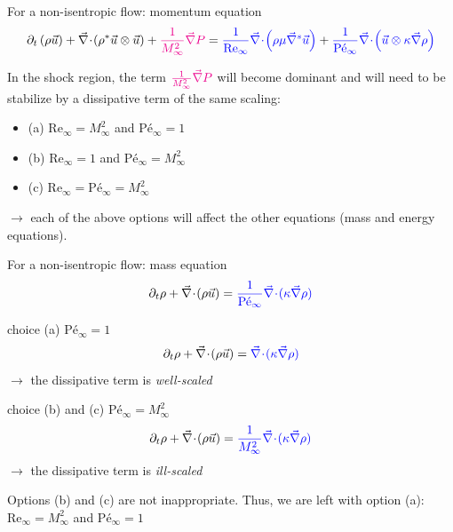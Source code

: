 \documentclass[xcolor=dvipsnames,10pt]{beamer}
\renewcommand{\Re}{\textrm{Re}}
\newcommand{\Pe}{\textrm{P\'e}}
\renewcommand{\div}{\vec{\nabla}\! \cdot \!}
\newcommand{\grad}{\vec{\nabla}}
\newcommand{\gradd}[1]{\vec{\nabla}^{#1}}
\begin{document}
\begin{frame}{For a non-isentropic flow: momentum equation}
\begin{align}
\partial_{t} \left( \rho \vec{u} \right) 
+ \div \left( \rho^* \vec{u}\otimes \vec{u} \right) 
+ \textcolor{magenta}{\frac{1}{M_\infty^2}\grad  P}  
= 
\textcolor{blue}{\frac{1}{\Re_\infty} \div \left( \rho \mu \gradd{s} \vec{u} \right)} +
\textcolor{blue}{\frac{1}{\Pe_\infty} \div \left(\vec{u}\otimes \kappa \grad  \rho \right)} \nonumber
\end{align}
\begin{block}{}
In the shock region, the term $\textcolor{magenta}{\frac{1}{M_\infty^2}\grad  P}  $ will become dominant and will need to be stabilize by a dissipative term of the same scaling:
\begin{itemize}
\setlength{\itemsep}{10pt}
\item (a) $\Re_\infty = M_\infty^2$ and $\Pe_\infty = 1$
\item (b) $\Re_\infty = 1$ and $\Pe_\infty = M_\infty^2$
\item (c) $\Re_\infty = \Pe_\infty = M_\infty^2$
\end{itemize}
$\longrightarrow$ each of the above options will affect the other equations (mass and energy equations).
\end{block}
\end{frame}
\begin{frame}{For a non-isentropic flow: mass equation}
\begin{equation}
\partial_{t} \rho+ \div  \left(  \rho \vec{u}  \right) = \textcolor{blue}{\frac{1}{\Pe_\infty} \div  ( \kappa \grad \rho )} \nonumber
\end{equation}
\begin{block}{choice (a) $\Pe_\infty = 1$}
\begin{equation}
\partial_{t} \rho+ \div  \left(  \rho \vec{u}  \right) = \textcolor{blue}{\div  ( \kappa \grad \rho )} \nonumber
\end{equation}
$\to$ the dissipative term is \emph{well-scaled}
\end{block}
\begin{block}{choice (b) and (c) $\Pe_\infty = M_\infty^2$}
\begin{equation}
\partial_{t} \rho+ \div  \left(  \rho \vec{u}  \right) = \textcolor{blue}{\frac{1}{M_\infty^2} \div  ( \kappa \grad \rho )} \nonumber
\end{equation}
$\to$ the dissipative term is \emph{ill-scaled}
\end{block}
Options (b) and (c) are not inappropriate. Thus, we are left with option (a): $\Re_\infty = M_\infty^2$ and $\Pe_\infty = 1$
\end{frame}
\end{document}
